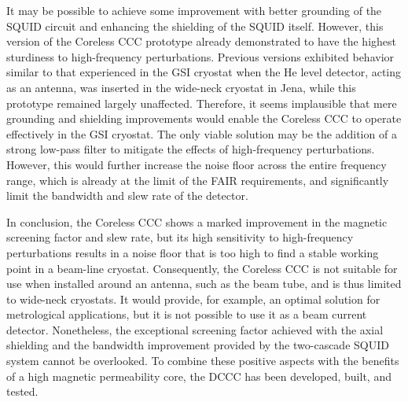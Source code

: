 \documentclass[12pt,a4paper]{report}
\begin{document}
	It may be possible to achieve some improvement with better grounding of the SQUID circuit and enhancing the shielding of the SQUID itself. However, this version of the Coreless CCC prototype already demonstrated to have the highest sturdiness to high-frequency perturbations. Previous versions exhibited behavior similar to that experienced in the GSI cryostat when the He level detector, acting as an antenna, was inserted in the wide-neck cryostat in Jena, while this prototype remained largely unaffected. Therefore, it seems implausible that mere grounding and shielding improvements would enable the Coreless CCC to operate effectively in the GSI cryostat. The only viable solution may be the addition of a strong low-pass filter to mitigate the effects of high-frequency perturbations. However, this would further increase the noise floor across the entire frequency range, which is already at the limit of the FAIR requirements, and significantly limit the bandwidth and slew rate of the detector.
	
	In conclusion, the Coreless CCC shows a marked improvement in the magnetic screening factor and slew rate, but its high sensitivity to high-frequency perturbations results in a noise floor that is too high to find a stable working point in a beam-line cryostat. Consequently, the Coreless CCC is not suitable for use when installed around an antenna, such as the beam tube, and is thus limited to wide-neck cryostats. It would provide, for example, an optimal solution for metrological applications, but it is not possible to use it as a beam current detector. Nonetheless, the exceptional screening factor achieved with the axial shielding and the bandwidth improvement provided by the two-cascade SQUID system cannot be overlooked. To combine these positive aspects with the benefits of a high magnetic permeability core, the DCCC has been developed, built, and tested.
	
	 
    \printbibliography
    
\end{document}
